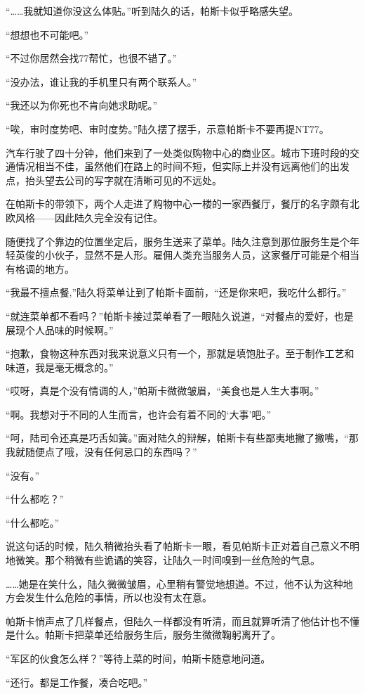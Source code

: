 “……我就知道你没这么体贴。”听到陆久的话，帕斯卡似乎略感失望。

“想想也不可能吧。”

“不过你居然会找77帮忙，也很不错了。”

“没办法，谁让我的手机里只有两个联系人。”

“我还以为你死也不肯向她求助呢。”

“唉，审时度势吧、审时度势。”陆久摆了摆手，示意帕斯卡不要再提NT77。

汽车行驶了四十分钟，他们来到了一处类似购物中心的商业区。城市下班时段的交通情况相当不佳，虽然他们在路上的时间不短，但实际上并没有远离他们的出发点，抬头望去公司的写字就在清晰可见的不远处。

在帕斯卡的带领下，两个人走进了购物中心一楼的一家西餐厅，餐厅的名字颇有北欧风格——因此陆久完全没有记住。

随便找了个靠边的位置坐定后，服务生送来了菜单。陆久注意到那位服务生是个年轻英俊的小伙子，显然不是人形。雇佣人类充当服务人员，这家餐厅可能是个相当有格调的地方。

“我最不擅点餐,”陆久将菜单让到了帕斯卡面前，“还是你来吧，我吃什么都行。”

“就连菜单都不看吗？”帕斯卡接过菜单看了一眼陆久说道，“对餐点的爱好，也是展现个人品味的时候啊。”

“抱歉，食物这种东西对我来说意义只有一个，那就是填饱肚子。至于制作工艺和味道，我是毫无概念的。”

“哎呀，真是个没有情调的人，”帕斯卡微微皱眉，“美食也是人生大事啊。”

“啊。我想对于不同的人生而言，也许会有着不同的‘大事’吧。”

“呵，陆司令还真是巧舌如簧。”面对陆久的辩解，帕斯卡有些鄙夷地撇了撇嘴，“那我就随便点了哦，没有任何忌口的东西吗？”

“没有。”

“什么都吃？”

“什么都吃。”

说这句话的时候，陆久稍微抬头看了帕斯卡一眼，看见帕斯卡正对着自己意义不明地微笑。那个稍微有些诡谲的笑容，让陆久一时间嗅到一丝危险的气息。

……她是在笑什么，陆久微微皱眉，心里稍有警觉地想道。不过，他不认为这种地方会发生什么危险的事情，所以也没有太在意。

帕斯卡悄声点了几样餐点，但陆久一样都没有听清，而且就算听清了他估计也不懂是什么。帕斯卡把菜单还给服务生后，服务生微微鞠躬离开了。

“军区的伙食怎么样？”等待上菜的时间，帕斯卡随意地问道。

“还行。都是工作餐，凑合吃吧。”


